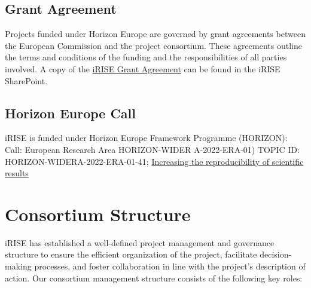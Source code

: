 \documentclass[
]{article}
\begin{document}
\hypertarget{grant-agreement}{%
\subsection{Grant Agreement}\label{grant-agreement}}

Projects funded under Horizon Europe are governed by grant agreements between the European Commission and the project consortium. These agreements outline the terms and conditions of the funding and the responsibilities of all parties involved. A copy of the \href{https://charitede.sharepoint.com/:f:/r/sites/iRISE/Shared\%20Documents/General/Grant\%20Agreement/AMD-101094853-4_Nov2023?csf=1\&web=1\&e=cuFpdE}{iRISE Grant Agreement} can be found in the iRISE SharePoint.

\hypertarget{horizon-europe-call}{%
\subsection{Horizon Europe Call}\label{horizon-europe-call}}

iRISE is funded under Horizon Europe Framework Programme (HORIZON):
Call: European Research Area HORIZON-WIDER A-2022-ERA-01)
TOPIC ID: HORIZON-WIDERA-2022-ERA-01-41; \href{https://ec.europa.eu/info/funding-tenders/opportunities/portal/screen/opportunities/topic-details/horizon-widera-2022-era-01-41}{Increasing the reproducibility of scientific results}

\hypertarget{consortium-structure}{%
\section{\texorpdfstring{\textbf{Consortium Structure}}{Consortium Structure}}\label{consortium-structure}}

iRISE has established a well-defined project management and governance
structure to ensure the efficient organization of the project,
facilitate decision-making processes, and foster collaboration in line
with the project's description of action. Our consortium management
structure consists of the following key roles:\\
\end{document}
